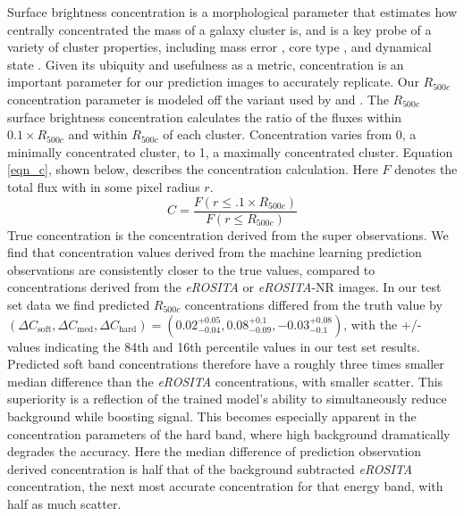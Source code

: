 Surface brightness concentration is a morphological parameter that estimates how centrally concentrated the mass of a galaxy cluster is, and is a key probe of a variety of cluster properties, including mass error \cite{Green_2019}, core type \cite{Santos_2008}, and dynamical state \cite{Rasia_2013, Parekh_2015, Lovisari_2017}. Given its ubiquity and usefulness as a metric, concentration is an important parameter for our prediction images to accurately replicate. Our $R_{500c}$ concentration parameter is modeled off the variant used by \cite{Lovisari_2017} and \cite{Green_2019}. The $R_{500c}$ surface brightness concentration calculates the ratio of the fluxes within $0.1 \times R_{500c}$ and within $R_{500c}$ of each cluster. Concentration varies from 0, a minimally concentrated cluster, to 1, a maximally concentrated cluster. Equation \ref{eqn_c}, shown below, describes the concentration calculation. Here $F$ denotes the total flux with in some pixel radius $r$.
\begin{equation}\label{eqn_c}
    C = \frac{F(r \leq .1 \times R_{500c})}{F( r \leq R_{500c})}
\end{equation}
True concentration is the concentration derived from the super observations.  We find that concentration values derived from the machine learning prediction observations are consistently closer to the true values, compared to concentrations derived from the \textit{eROSITA} or \textit{eROSITA}-NR images. In our test set data we find predicted $R_{500c}$ concentrations differed from the truth value by $(\Delta C_{\mathrm{soft}},\Delta C_{\mathrm{med}},\Delta C_{\mathrm{hard}}) = (0.02_{-0.04}^{+0.05}, 0.08_{-0.09}^{+0.1}, -0.03_{-0.1}^{+0.08})$, with the +/- values indicating the 84th and 16th percentile values in our test set results. Predicted soft band concentrations therefore have a roughly three times smaller median difference than the \textit{eROSITA} concentrations, with smaller scatter. This superiority is a reflection of the trained model's ability to simultaneously reduce background while boosting signal. This becomes especially apparent in the concentration parameters of the hard band, where high background dramatically degrades the accuracy. Here the median difference of prediction observation derived concentration is half that of the background subtracted \textit{eROSITA} concentration, the next most accurate concentration for that energy band, with half as much scatter. 

